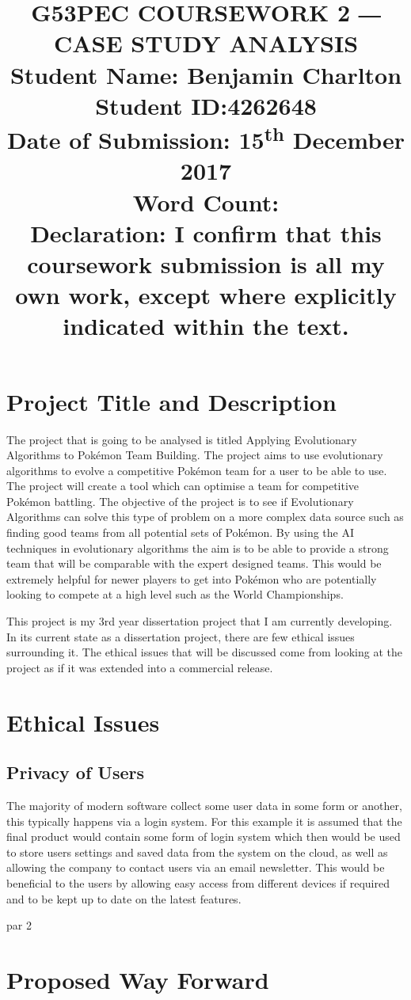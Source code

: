 \documentclass[a4paper]{article}
\newcommand{\Pokemon}{Pok\'{e}mon}
\begin{document}
\title{
    G53PEC COURSEWORK 2 ― CASE STUDY ANALYSIS \\
    \large{Student Name: Benjamin Charlton \\
            Student ID:\@ 4262648 \\
            Date of Submission: 15\textsuperscript{th} December 2017\\
            Word Count: \\
            Declaration: I confirm that this coursework submission is all my own work, except where explicitly indicated within the text.}
    \date{}}
\maketitle

\section{Project Title and Description}
The project that is going to be analysed is titled Applying Evolutionary Algorithms to \Pokemon{} Team Building.
The project aims to use evolutionary algorithms to evolve a competitive \Pokemon{} team for a user to be able to use.
The project will create a tool which can optimise a team for competitive Pokémon battling.
The objective of the project is to see if Evolutionary Algorithms can solve this type of problem on a more complex data source such as finding good teams from all potential sets of Pokémon.
By using the AI techniques in evolutionary algorithms the aim is to be able to provide a strong team that will be comparable with the expert designed teams.
This would be extremely helpful for newer players to get into \Pokemon{} who are potentially looking to compete at a high level such as the World Championships\cite{worldsOverview}.
\par
This project is my 3rd year dissertation project that I am currently developing.
In its current state as a dissertation project, there are few ethical issues surrounding it.
The ethical issues that will be discussed come from looking at the project as if it was extended into a commercial release.

\section{Ethical Issues}
\subsection{Privacy of Users}
The majority of modern software collect some user data in some form or another, this typically happens via a login system.
For this example it is assumed that the final product would contain some form of login system which then would be used to store users settings and saved data from the system on the cloud, as well as allowing the company to contact users via an email newsletter.
This would be beneficial to the users by allowing easy access from different devices if required and to be kept up to date on the latest features.
\par
par 2

\section{Proposed Way Forward}



\end{document}
